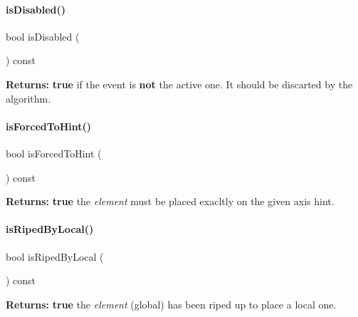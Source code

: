 \paragraph{\texorpdfstring{is\+Disabled()}{isDisabled()}}
{\footnotesize\ttfamily bool is\+Disabled (\begin{DoxyParamCaption}{ }\end{DoxyParamCaption}) const\hspace{0.3cm}{\ttfamily [inline]}}

{\bfseries Returns\+:} {\bfseries true} if the event is {\bfseries not} the active one. It should be discarted by the algorithm. \mbox{\label{classKite_1_1RoutingEvent_a6e38564fbae008179d865f844acba59a}} 
\paragraph{\texorpdfstring{is\+Forced\+To\+Hint()}{isForcedToHint()}}
{\footnotesize\ttfamily bool is\+Forced\+To\+Hint (\begin{DoxyParamCaption}{ }\end{DoxyParamCaption}) const\hspace{0.3cm}{\ttfamily [inline]}}

{\bfseries Returns\+:} {\bfseries true} the {\itshape element} must be placed exacltly on the given axis hint. \mbox{\label{classKite_1_1RoutingEvent_ac460ce43ff71dcdf11091403c4ba9060}} 
\paragraph{\texorpdfstring{is\+Riped\+By\+Local()}{isRipedByLocal()}}
{\footnotesize\ttfamily bool is\+Riped\+By\+Local (\begin{DoxyParamCaption}{ }\end{DoxyParamCaption}) const\hspace{0.3cm}{\ttfamily [inline]}}

{\bfseries Returns\+:} {\bfseries true} the {\itshape element} (global) has been riped up to place a local one. \mbox{\label{classKite_1_1RoutingEvent_a150a8fe8d214e9de76153c1d20676a98}} 

